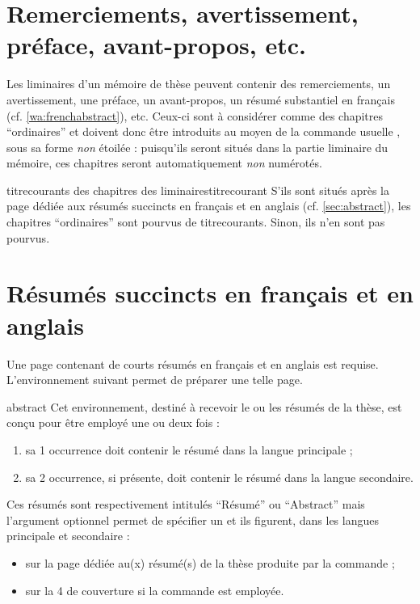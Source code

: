 \section{Remerciements, avertissement, préface, avant-propos, etc.}

Les \glspl{liminaire} d'un mémoire de thèse peuvent contenir des remerciements,
un avertissement, une préface, un avant-propos, un résumé substantiel en
français (cf. \vref{wa:frenchabstract}), etc. Ceux-ci sont à considérer comme
des chapitres \enquote{ordinaires} et doivent donc être introduits au moyen de
la commande usuelle , sous sa forme \emph{non} étoilée :
puisqu'ils seront situés dans la partie liminaire du mémoire, ces chapitres
seront automatiquement \emph{non} numérotés.

\begin{dbremark}{\protect\Glspl{titrecourant} des chapitres des \protect\glspl{liminaire}}{titrecourant}
  S'ils sont situés après la page dédiée aux résumés succincts en français et
  en anglais (cf. \vref{sec:abstract}), les chapitres \enquote{ordinaires} sont
  pourvus de \glspl{titrecourant}. Sinon, ils n'en sont pas pourvus.
\end{dbremark}

\section{Résumés succincts en français et en anglais}\label{sec:abstract}

Une page contenant de courts résumés en français et en anglais est requise.
L'environnement  suivant permet de préparer une telle
page.
%
\begin{docEnvironment}[doclang/environment content=résumé,doc description=\mandatory]{abstract}{}
  Cet environnement, destiné à recevoir le ou les résumés de la thèse, est
  conçu pour être employé une ou deux fois :
  \begin{enumerate}
  \item sa 1\iere{} occurrence doit contenir le résumé dans la langue
    principale ;
  \item sa 2\ieme{} occurrence, si présente, doit contenir le résumé dans la
    langue secondaire.
  \end{enumerate}
  Ces résumés sont respectivement intitulés \enquote{Résumé} ou
  \foreignquote{english}{Abstract}\selonlangue{} mais l'argument optionnel
  permet de spécifier un \redefexprcle et ils
  figurent, dans les langues principale et secondaire :
  \begin{itemize}
  \item sur la page dédiée au(x) résumé(s) de la thèse produite par la commande
     ;
  \item sur la 4\ieme{} de couverture si la commande  est
    employée.
  \end{itemize}
\end{docEnvironment}

